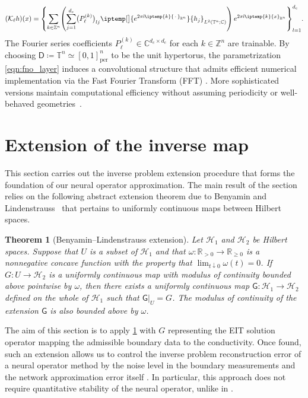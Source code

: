 \documentclass[pdflatex,sn-mathphys-num]{sn-jnl-preprint}
\let\originalleft\left %
\let\originalright\right
\renewcommand{\left}{\mathopen{}\mathclose\bgroup\originalleft}
\renewcommand{\right}{\aftergroup\egroup\originalright}
\newcommand{\Z}{\mathbb{Z}}
\newcommand{\R}{\mathbb{R}}
\newcommand{\T}{\mathbb{T}}
\newcommand{\cH}{\mathcal{H}}
\newcommand{\cK}{\mathcal{K}}
\newcommand{\sfD}{\mathsf{D}}
\newcommand{\sfG}{\mathsf{G}}
\newcommand{\ip}{\iptemp}
\newcommand{\defeq}{\coloneqq} %
\newcommand{\slot}{{\,\cdot\,}}
\theoremstyle{thmstyleone}%
\newtheorem{theorem}{Theorem}[section]%
\theoremstyle{thmstyletwo}%
\theoremstyle{thmstylethree}%
\numberwithin{equation}{section}
\numberwithin{theorem}{section}
\begin{document}
\begin{align}\label{eqn:fno_layer}
    (\cK_\ell h)(x) = \left\{\sum_{k \in \Z^n}\left(\sum_{j=1}^{d_\mathrm{c}} \bigl(P^{(k)}_\ell\bigr)_{l j}\ip[\big]{e^{2\pi \mathsf{i} \ip{k}{\slot}_{\R^n}}}{h_j}_{L^2(\mathbb{T}^n;\mathbb{C})} \right) \, e^{2\pi \mathsf{i} \ip{k}{x}_{\R^n}}\right\}_{l=1}^{d_\mathrm{c}}.
\end{align}
The Fourier series coefficients $P^{(k)}_\ell \in \mathbb{C}^{d_{c} \times d_{c}}$ for each $k\in\Z^n$ are trainable. By choosing $\sfD\defeq \T^n \simeq [0,1]^n_{\mathrm{per}}$ to be the unit hypertorus, the parametrization \eqref{eqn:fno_layer} induces a convolutional structure that admits efficient numerical implementation via the Fast Fourier Transform (FFT) \cite{lanthaler2024discretization,li2020fourier}. More sophisticated versions maintain computational efficiency without assuming periodicity or well-behaved geometries~\cite{li2023geometry,li2023fourier,li2025geometric,huang2025operator,lanthaler2023nonlocality}.

\section{Extension of the inverse map}\label{sec:extend}
This section carries out the inverse problem extension procedure that forms the foundation of our neural operator approximation. The main result of the section relies on the following abstract extension theorem due to Benyamin and Lindenstrauss~\cite[Thm.~1.12, p.~18]{benyamini1998geometric} that pertains to uniformly continuous maps between Hilbert spaces.

\begin{theorem}[Benyamin--Lindenstrauss extension]\label{thm:hilbert_extension_ref}
    Let $\cH_1$ and $\cH_2$ be Hilbert spaces. Suppose that $U$ is a subset of $\cH_1$ and that $\omega\colon \R_{>0}\to \R_{\geq 0}$ is a nonnegative concave function with the property that $\lim_{t\downarrow 0}\omega(t)=0$. If $G\colon U\to \cH_2$ is a uniformly continuous map with modulus of continuity bounded above pointwise by $\omega$, then there exists a uniformly continuous map $\sfG\colon \cH_1\to \cH_2$ defined on the whole of $\cH_1$ such that $\sfG|_{U}=G$. The modulus of continuity of the extension $\sfG$ is also bounded above by $\omega$.
\end{theorem}

The aim of this section is to apply \cref{thm:hilbert_extension_ref} with $G$ representing the EIT solution operator mapping the admissible boundary data to the conductivity. Once found, such an extension allows us to control the inverse problem reconstruction error of a neural operator method by the noise level in the boundary measurements and the network approximation error itself \cite[Sec.~4.1.2, Eqn.~(4.10), p.~27]{nelsen2025operator}. In particular, this approach does not require quantitative stability of the neural operator, unlike in \cite{pineda2023deep}.
\end{document}
